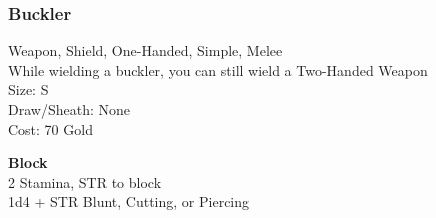 \subsubsection{Buckler}\label{weapon:buckler}
Weapon, Shield, One-Handed, Simple, Melee\\
While wielding a buckler, you can still wield a Two-Handed Weapon\\
Size: S\\
Draw/Sheath: None\\
Cost: 70 Gold

\textbf{Block}\\
2 Stamina, STR to block\\
1d4 + \texttimes STR Blunt, Cutting, or Piercing

